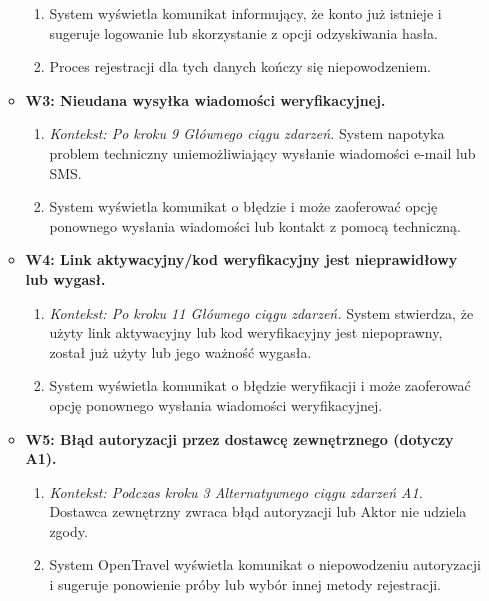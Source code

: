 \documentclass[a4paper,12pt]{article}
\begin{document}
\begin{itemize}
\begin{itemize}
\begin{enumerate}
                    \item System wyświetla komunikat informujący, że konto już istnieje i sugeruje logowanie lub skorzystanie z opcji odzyskiwania hasła.
                    \item Proces rejestracji dla tych danych kończy się niepowodzeniem.
                \end{enumerate}
            \item \textbf{W3: Nieudana wysyłka wiadomości weryfikacyjnej.}
                \begin{enumerate}
                    \item \textit{Kontekst: Po kroku 9 Głównego ciągu zdarzeń.} System napotyka problem techniczny uniemożliwiający wysłanie wiadomości e-mail lub SMS.
                    \item System wyświetla komunikat o błędzie i może zaoferować opcję ponownego wysłania wiadomości lub kontakt z pomocą techniczną.
                \end{enumerate}
            \item \textbf{W4: Link aktywacyjny/kod weryfikacyjny jest nieprawidłowy lub wygasł.}
                \begin{enumerate}
                    \item \textit{Kontekst: Po kroku 11 Głównego ciągu zdarzeń.} System stwierdza, że użyty link aktywacyjny lub kod weryfikacyjny jest niepoprawny, został już użyty lub jego ważność wygasła.
                    \item System wyświetla komunikat o błędzie weryfikacji i może zaoferować opcję ponownego wysłania wiadomości weryfikacyjnej.
                \end{enumerate}
            \item \textbf{W5: Błąd autoryzacji przez dostawcę zewnętrznego (dotyczy A1).}
                \begin{enumerate}
                    \item \textit{Kontekst: Podczas kroku 3 Alternatywnego ciągu zdarzeń A1.} Dostawca zewnętrzny zwraca błąd autoryzacji lub Aktor nie udziela zgody.
                    \item System OpenTravel wyświetla komunikat o niepowodzeniu autoryzacji i sugeruje ponowienie próby lub wybór innej metody rejestracji.
                \end{enumerate}
        \end{itemize}
\end{itemize}
\end{document}
